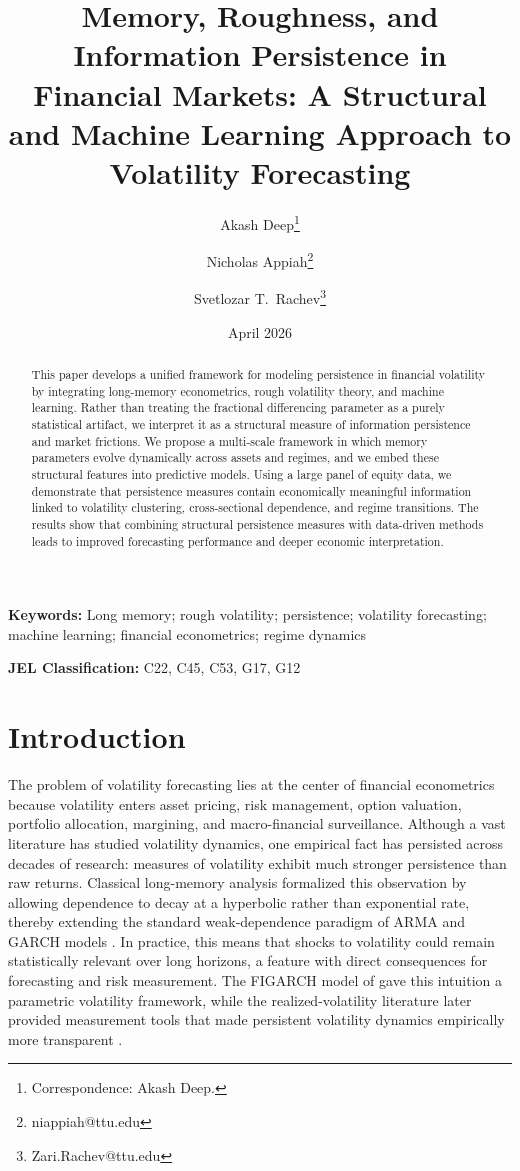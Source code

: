 \documentclass[12pt]{article}
\title{\textbf{Memory, Roughness, and Information Persistence in Financial Markets:
A Structural and Machine Learning Approach to Volatility Forecasting}}
\author{Akash Deep\thanks{Correspondence: Akash Deep.} \and
        Nicholas Appiah\thanks{niappiah@ttu.edu} \and
        Svetlozar T.\ Rachev\thanks{Zari.Rachev@ttu.edu}}
\date{April 2026}
\begin{document}
\maketitle

\begin{abstract}
This paper develops a unified framework for modeling persistence in financial volatility by integrating long-memory econometrics, rough volatility theory, and machine learning. Rather than treating the fractional differencing parameter as a purely statistical artifact, we interpret it as a structural measure of information persistence and market frictions. We propose a multi-scale framework in which memory parameters evolve dynamically across assets and regimes, and we embed these structural features into predictive models. Using a large panel of equity data, we demonstrate that persistence measures contain economically meaningful information linked to volatility clustering, cross-sectional dependence, and regime transitions. The results show that combining structural persistence measures with data-driven methods leads to improved forecasting performance and deeper economic interpretation.
\end{abstract}

\noindent\textbf{Keywords:} Long memory; rough volatility; persistence; volatility forecasting; machine learning; financial econometrics; regime dynamics

\noindent\textbf{JEL Classification:} C22, C45, C53, G17, G12

\bigskip

\tableofcontents
\newpage

\section{Introduction}

The problem of volatility forecasting lies at the center of financial econometrics because volatility enters asset pricing, risk management, option valuation, portfolio allocation, margining, and macro-financial surveillance. Although a vast literature has studied volatility dynamics, one empirical fact has persisted across decades of research: measures of volatility exhibit much stronger persistence than raw returns. Classical long-memory analysis formalized this observation by allowing dependence to decay at a hyperbolic rather than exponential rate, thereby extending the standard weak-dependence paradigm of ARMA and GARCH models \citep{GrangerJoyeux1980, Hosking1981, Ding1993}. In practice, this means that shocks to volatility could remain statistically relevant over long horizons, a feature with direct consequences for forecasting and risk measurement. The FIGARCH model of \citet{Baillie1996} gave this intuition a parametric volatility framework, while the realized-volatility literature later provided measurement tools that made persistent volatility dynamics empirically more transparent \citep{Andersen2003, BarndorffNielsen2002, Corsi2009}.
\end{document}
